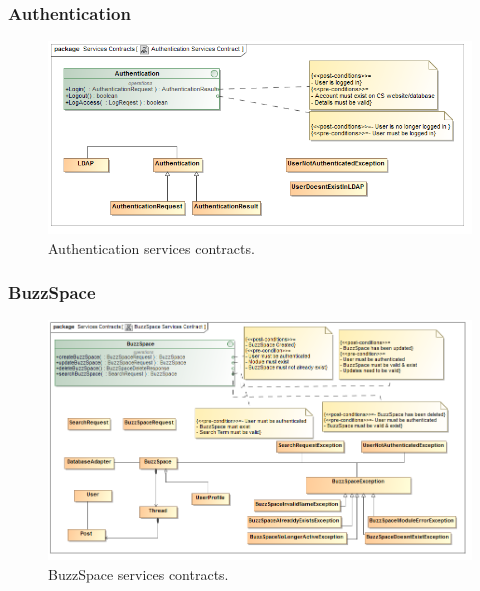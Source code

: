 \documentclass [a4paper,12pt] {article}
\begin{document}
		\subsubsection{Authentication}
			\begin{figure}[H]
						\centering
						\includegraphics[width=1.0\textwidth]{AuthenticationSC.png}
						\caption{Authentication services contracts.}
			\end{figure}
		\subsubsection{BuzzSpace}
					\begin{figure}[H]
						\centering
						\includegraphics[width=1.0\textwidth]{BuzzSpaceSC.png}
						\caption{BuzzSpace services contracts.}
					\end{figure}
\end{document}
